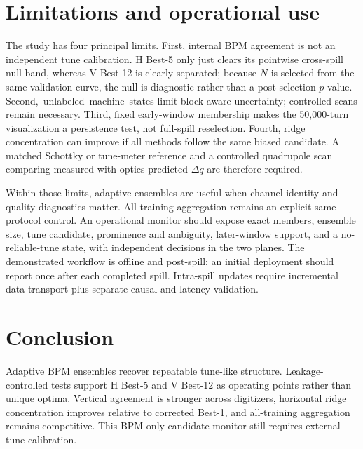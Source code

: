 \documentclass[]{jacow}
\begin{document}
\section{Limitations and operational use}

The study has four principal limits. First, internal BPM agreement is not an independent tune calibration. H Best-5 only just clears its pointwise cross-spill null band, whereas V Best-12 is clearly separated; because $N$ is selected from the same validation curve, the null is diagnostic rather than a post-selection $p$-value. \mbox{Second, unlabeled machine states} limit block-aware uncertainty; controlled scans remain necessary. Third, fixed early-window membership makes the 50,000-turn visualization a persistence test, not full-spill reselection. Fourth, ridge concentration can improve if all methods follow the same biased candidate. A matched Schottky or tune-meter reference and a controlled quadrupole scan comparing measured with optics-predicted $\Delta q$ are therefore required.

Within those limits, adaptive ensembles are useful when channel identity and quality diagnostics matter. All-training aggregation remains an explicit same-protocol control. An operational monitor should expose exact members, ensemble size, tune candidate, prominence and ambiguity, later-window support, and a no-reliable-tune state, with independent decisions in the two planes. The demonstrated workflow is offline and post-spill; an initial deployment should report once after each completed spill. Intra-spill updates require incremental data transport plus separate causal and latency validation.

\section{Conclusion}

Adaptive BPM ensembles recover repeatable tune-like structure. Leakage-controlled tests support H Best-5 and V Best-12 as operating points rather than unique optima. Vertical agreement is stronger across digitizers, horizontal ridge concentration improves relative to corrected Best-1, and all-training aggregation remains competitive. This BPM-only candidate monitor still requires external tune calibration.
\end{document}
